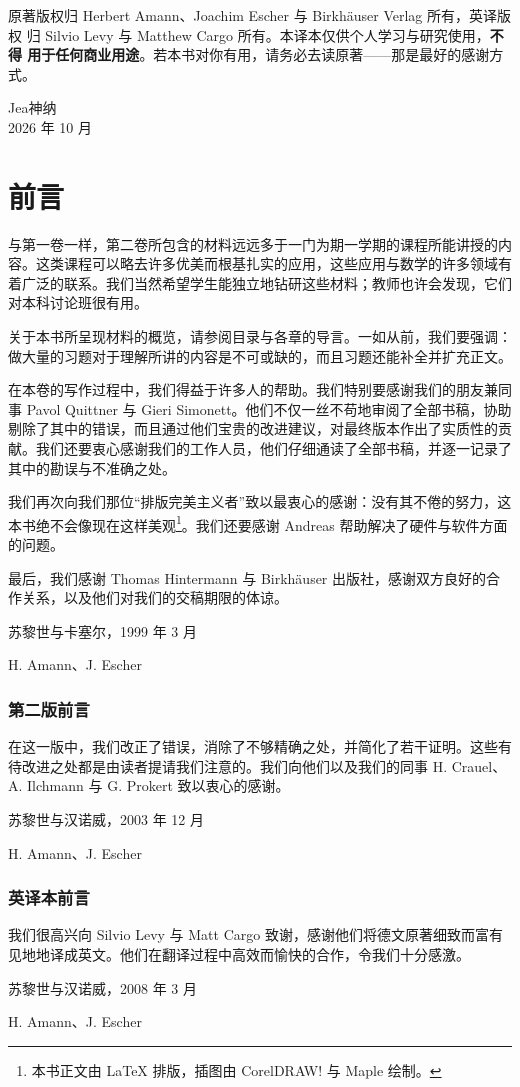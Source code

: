 原著版权归 Herbert Amann、Joachim Escher 与 Birkhäuser Verlag 所有，英译版权
归 Silvio Levy 与 Matthew Cargo 所有。本译本仅供个人学习与研究使用，\textbf{不得
用于任何商业用途}。若本书对你有用，请务必去读原著——那是最好的感谢方式。

\vspace{2ex}
\begin{flushright}
Jea神纳\\
2026 年 10 月
\end{flushright}
\chapter*{前言}

与第一卷一样，第二卷所包含的材料远远多于一门为期一学期的课程所能讲授的内容。这类课程可以略去许多优美而根基扎实的应用，这些应用与数学的许多领域有着广泛的联系。我们当然希望学生能独立地钻研这些材料；教师也许会发现，它们对本科讨论班很有用。

关于本书所呈现材料的概览，请参阅目录与各章的导言。一如从前，我们要强调：做大量的习题对于理解所讲的内容是不可或缺的，而且习题还能补全并扩充正文。

在本卷的写作过程中，我们得益于许多人的帮助。我们特别要感谢我们的朋友兼同事 Pavol Quittner 与 Gieri Simonett。他们不仅一丝不苟地审阅了全部书稿，协助剔除了其中的错误，而且通过他们宝贵的改进建议，对最终版本作出了实质性的贡献。我们还要衷心感谢我们的工作人员，他们仔细通读了全部书稿，并逐一记录了其中的勘误与不准确之处。

我们再次向我们那位“排版完美主义者”致以最衷心的感谢：没有其不倦的努力，这本书绝不会像现在这样美观\footnote{本书正文由 \LaTeX{} 排版，插图由 CorelDRAW! 与 Maple 绘制。}。我们还要感谢 Andreas 帮助解决了硬件与软件方面的问题。

最后，我们感谢 Thomas Hintermann 与 Birkhäuser 出版社，感谢双方良好的合作关系，以及他们对我们的交稿期限的体谅。

苏黎世与卡塞尔，1999 年 3 月

H. Amann、J. Escher

\subsection*{第二版前言}

在这一版中，我们改正了错误，消除了不够精确之处，并简化了若干证明。这些有待改进之处都是由读者提请我们注意的。我们向他们以及我们的同事 H. Crauel、A. Ilchmann 与 G. Prokert 致以衷心的感谢。

苏黎世与汉诺威，2003 年 12 月

H. Amann、J. Escher

\subsection*{英译本前言}

我们很高兴向 Silvio Levy 与 Matt Cargo 致谢，感谢他们将德文原著细致而富有见地地译成英文。他们在翻译过程中高效而愉快的合作，令我们十分感激。

苏黎世与汉诺威，2008 年 3 月

H. Amann、J. Escher
